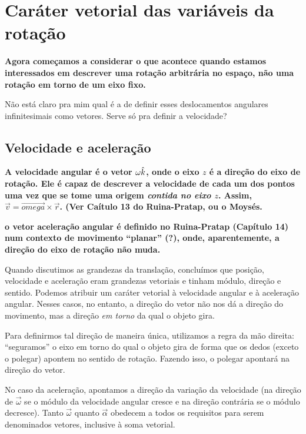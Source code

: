 \section{Caráter vetorial das variáveis da rotação}

\textbf{Agora começamos a considerar o que acontece quando estamos interessados em descrever uma rotação arbitrária no espaço, não uma rotação em torno de um eixo fixo.}

Não está claro pra mim qual é a de definir esses deslocamentos angulares infinitesimais como vetores. Serve só pra definir a velocidade?

\subsection{Velocidade e aceleração}

\textbf{A velocidade angular é o vetor $\omega\hat{k}$, onde o eixo $z$ é a direção do eixo de rotação. Ele é capaz de descrever a velocidade de cada um dos pontos uma vez que se tome uma origem \emph{contida no eixo $z$}. Assim, $\vec{v} = \vec{omega}\times\vec{r}$. (Ver Caítulo 13 do Ruina-Pratap, ou o Moysés.}

\textbf{o vetor aceleração angular é definido no Ruina-Pratap (Capítulo 14) num contexto de movimento ``planar'' (?), onde, aparentemente, a direção do eixo de rotação não muda.}

Quando discutimos as grandezas da translação, concluímos que posição, velocidade e aceleração eram grandezas vetoriais e tinham módulo, direção e sentido. Podemos atribuir um caráter vetorial à velocidade angular e à aceleração angular. Nesses casos, no entanto, a direção do vetor não nos dá a direção do movimento, mas a direção \emph{em torno} da qual o objeto gira.

Para definirmos tal direção de maneira única, utilizamos a regra da mão direita: ``seguramos'' o eixo em torno do qual o objeto gira de forma que os dedos (exceto o polegar) apontem no sentido de rotação. Fazendo isso, o polegar apontará na direção do vetor.

No caso da aceleração, apontamos a direção da variação da velocidade (na direção de $\vec{\omega}$ se o módulo da velocidade angular cresce e na direção contrária se o módulo decresce). Tanto $\vec{\omega}$ quanto $\vec{\alpha}$ obedecem a todos os requisitos para serem denominados vetores, inclusive à soma vetorial.

